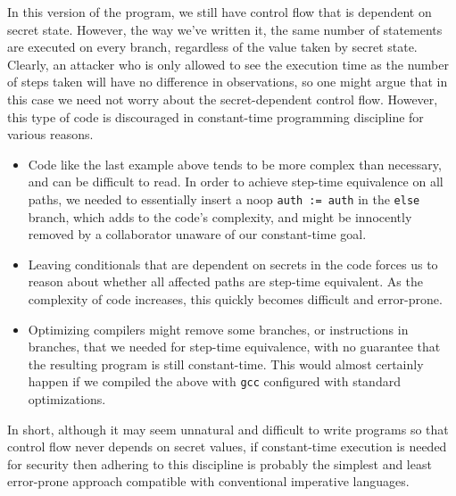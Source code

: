 \documentclass[11pt,twoside]{scrartcl}
\begin{document}
In this version of the program, we still have control flow that is dependent on secret state. However, the way we've written it, the same number of statements are executed on every branch, regardless of the value taken by secret state. Clearly, an attacker who is only allowed to see the execution time as the number of steps taken will have no difference in observations, so one might argue that in this case we need not worry about the secret-dependent control flow. However, this type of code is discouraged in constant-time programming discipline for various reasons.
\begin{itemize}
\item Code like the last example above tends to be more complex than necessary, and can be difficult to read. In order to achieve step-time equivalence on all paths, we needed to essentially insert a noop \texttt{auth := auth} in the \texttt{else} branch, which adds to the code's complexity, and might be innocently removed by a collaborator unaware of our constant-time goal.

\item Leaving conditionals that are dependent on secrets in the code forces us to reason about whether all affected paths are step-time equivalent. As the complexity of code increases, this quickly becomes difficult and error-prone.

\item Optimizing compilers might remove some branches, or instructions in branches, that we needed for step-time equivalence, with no guarantee that the resulting program is still constant-time. This would almost certainly happen if we compiled the above with \texttt{gcc} configured with standard optimizations.
\end{itemize}
In short, although it may seem unnatural and difficult to write programs so that control flow never depends on secret values, if constant-time execution is needed for security then adhering to this discipline is probably the simplest and least error-prone approach compatible with conventional imperative languages.



\end{document}
